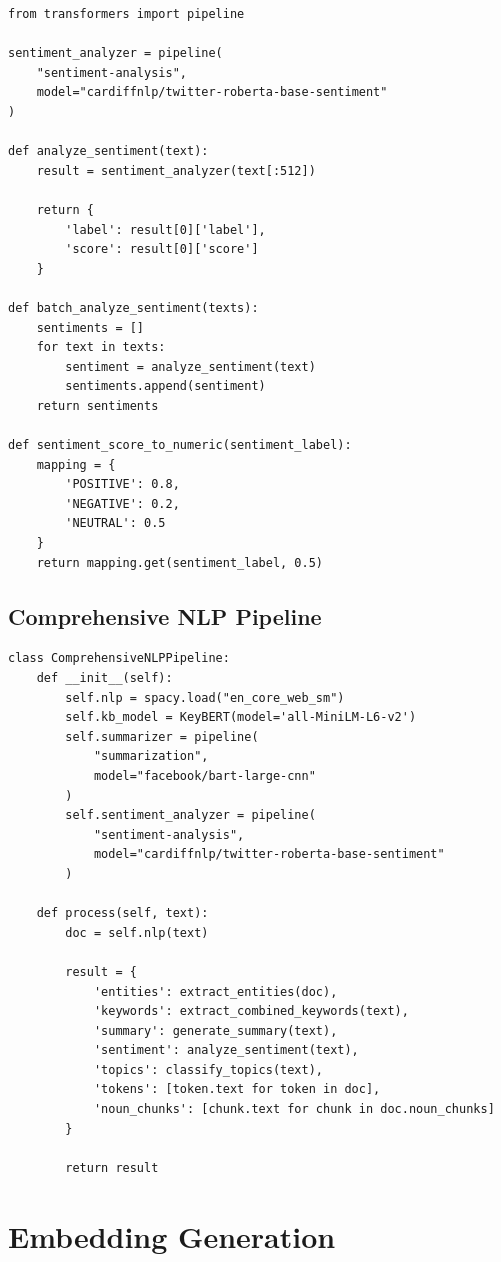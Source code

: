 \documentclass[12pt,a4paper]{report}
\begin{document}
\begin{lstlisting}
from transformers import pipeline

sentiment_analyzer = pipeline(
    "sentiment-analysis",
    model="cardiffnlp/twitter-roberta-base-sentiment"
)

def analyze_sentiment(text):
    result = sentiment_analyzer(text[:512])
    
    return {
        'label': result[0]['label'],
        'score': result[0]['score']
    }

def batch_analyze_sentiment(texts):
    sentiments = []
    for text in texts:
        sentiment = analyze_sentiment(text)
        sentiments.append(sentiment)
    return sentiments

def sentiment_score_to_numeric(sentiment_label):
    mapping = {
        'POSITIVE': 0.8,
        'NEGATIVE': 0.2,
        'NEUTRAL': 0.5
    }
    return mapping.get(sentiment_label, 0.5)
\end{lstlisting}

\section{Comprehensive NLP Pipeline}

\begin{lstlisting}
class ComprehensiveNLPPipeline:
    def __init__(self):
        self.nlp = spacy.load("en_core_web_sm")
        self.kb_model = KeyBERT(model='all-MiniLM-L6-v2')
        self.summarizer = pipeline(
            "summarization",
            model="facebook/bart-large-cnn"
        )
        self.sentiment_analyzer = pipeline(
            "sentiment-analysis",
            model="cardiffnlp/twitter-roberta-base-sentiment"
        )
    
    def process(self, text):
        doc = self.nlp(text)
        
        result = {
            'entities': extract_entities(doc),
            'keywords': extract_combined_keywords(text),
            'summary': generate_summary(text),
            'sentiment': analyze_sentiment(text),
            'topics': classify_topics(text),
            'tokens': [token.text for token in doc],
            'noun_chunks': [chunk.text for chunk in doc.noun_chunks]
        }
        
        return result
\end{lstlisting}

\chapter{Embedding Generation}
\end{document}
